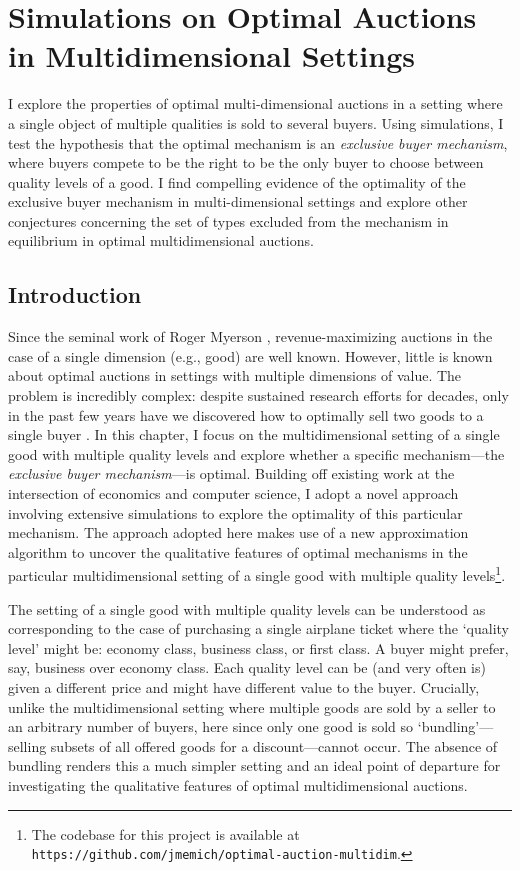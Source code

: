 \graphicspath{ {./ch_auctions_simulations} }

\chapter{Simulations on Optimal Auctions in Multidimensional Settings}

I explore the properties of optimal multi-dimensional auctions in a setting where a single object of multiple qualities is sold to several buyers. Using simulations, I test the hypothesis that the optimal mechanism is an \textit{exclusive buyer mechanism}, where buyers compete to be the right to be the only buyer to choose between quality levels of a good. I find compelling evidence of the optimality of the exclusive buyer mechanism in multi-dimensional settings and explore other conjectures concerning the set of types excluded from the mechanism in equilibrium in optimal multidimensional auctions.

\section{Introduction}

Since the seminal work of Roger Myerson \autocite*{myerson1981optimal}, revenue-maximizing auctions in the case of a single dimension (e.g., good) are well known. However, little is known about optimal auctions in settings with multiple dimensions of value. The problem is incredibly complex: despite sustained research efforts for decades, only in the past few years have we discovered how to optimally sell two goods to a single buyer \autocite{daskalakis2017strong}. In this chapter, I focus on the multidimensional setting of a single good with multiple quality levels and explore whether a specific mechanism---the \textit{exclusive buyer mechanism}---is optimal. Building off existing work at the intersection of economics and computer science, I adopt a novel approach involving extensive simulations to explore the optimality of this particular mechanism. The approach adopted here makes use of a new approximation algorithm to uncover the qualitative features of optimal mechanisms in the particular multidimensional setting of a single good with multiple quality levels\footnote{The codebase for this project is available at \texttt{https://github.com/jmemich/optimal-auction-multidim}.}.

The setting of a single good with multiple quality levels can be understood as corresponding to the case of purchasing a single airplane ticket where the `quality level' might be: economy class, business class, or first class. A buyer might prefer, say, business over economy class. Each quality level can be (and very often is) given a different price and might have different value to the buyer. Crucially, unlike the multidimensional setting where multiple goods are sold by a seller to an arbitrary number of buyers, here since only one good is sold so `bundling'---selling subsets of all offered goods for a discount---cannot occur. The absence of bundling renders this a much simpler setting and an ideal point of departure for investigating the qualitative features of optimal multidimensional auctions.

